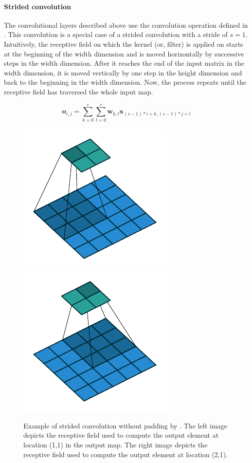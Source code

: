 \paragraph{Strided convolution}
The convolutional layers described above use the convolution operation defined in . This convolution is a special case of a strided convolution with a stride of $s=1$. Intuitively, the receptive field on which the kernel (or, filter) is applied on starts at the beginning of the width dimension and is moved horizontally by successive steps in the width dimension. After it reaches the end of the input matrix in the width dimension, it is moved vertically by one step in the height dimension and back to the beginning in the width dimension. Now, the process repeats until the receptive field has traversed the whole input map.

\begin{equation}
\label{eq:stridedconv}
    \textbf{o}_{i,j}=\sum_{k=0}^c\sum_{l=0}^c \textbf{w}_{k,l} \textbf{x}_{(s-1)*i+k,(s-1)*j+l}
\end{equation}

\begin{figure}
    \centering
    \includegraphics{graphics/no_padding_strides_00.pdf}
    \includegraphics{graphics/no_padding_strides_01.pdf}
    \caption{Example of strided convolution without padding by \citet{dumoulin2016guide}. The left image depicts the receptive field used to compute the output element at location (1,1) in the output map. The right image depicts the receptive field used to compute the output element at location (2,1).}
    \label{fig:stridedconv}
\end{figure}

